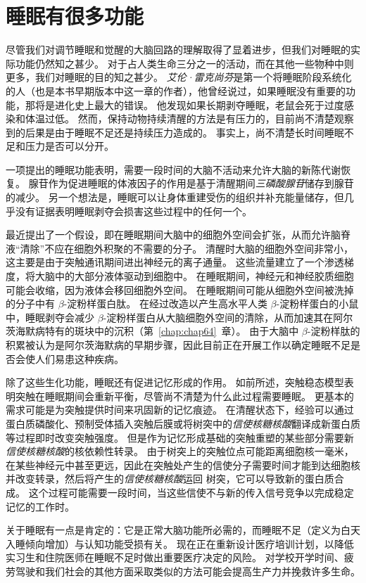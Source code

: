 \section{睡眠有很多功能}

尽管我们对调节睡眠和觉醒的大脑回路的理解取得了显着进步，但我们对睡眠的实际功能仍然知之甚少。
对于占人类生命三分之一的活动，而在其他一些物种中则更多，我们对睡眠的目的知之甚少。
\textit{艾伦·雷克尚芬}是第一个将睡眠阶段系统化的人（也是本书早期版本中这一章的作者），他曾经说过，如果睡眠没有重要的功能，那将是进化史上最大的错误。
他发现如果长期剥夺睡眠，老鼠会死于过度感染和体温过低。
然而，保持动物持续清醒的方法是有压力的，目前尚不清楚观察到的后果是由于睡眠不足还是持续压力造成的。
事实上，尚不清楚长时间睡眠不足和压力是否可以分开。


一项提出的睡眠功能表明，需要一段时间的大脑不活动来允许大脑的新陈代谢恢复。
腺苷作为促进睡眠的体液因子的作用是基于清醒期间\textit{三磷酸腺苷}储存到腺苷的减少。
另一个想法是，睡眠可以让身体重建受伤的组织并补充能量储存，但几乎没有证据表明睡眠剥夺会损害这些过程中的任何一个。


最近提出了一个假设，即在睡眠期间大脑中的细胞外空间会扩张，从而允许脑脊液“清除”不应在细胞外积聚的不需要的分子。
清醒时大脑的细胞外空间非常小，这主要是由于突触通讯期间进出神经元的离子通量。
这些流量建立了一个渗透梯度，将大脑中的大部分液体驱动到细胞中。
在睡眠期间，神经元和神经胶质细胞可能会收缩，因为液体会移回细胞外空间。
在睡眠期间可能从细胞外空间被洗掉的分子中有 $ \beta $-淀粉样蛋白肽。
在经过改造以产生高水平人类 $ \beta $-淀粉样蛋白的小鼠中，睡眠剥夺会减少 $ \beta $-淀粉样蛋白从大脑细胞外空间的清除，从而加速其在阿尔茨海默病特有的斑块中的沉积（第~\ref{chap:chap64}~章）。
由于大脑中 $ \beta $-淀粉样肽的积累被认为是阿尔茨海默病的早期步骤，因此目前正在开展工作以确定睡眠不足是否会使人们易患这种疾病。


除了这些生化功能，睡眠还有促进记忆形成的作用。
如前所述，突触稳态模型表明突触在睡眠期间会重新平衡，尽管尚不清楚为什么此过程需要睡眠。
更基本的需求可能是为突触提供时间来巩固新的记忆痕迹。
在清醒状态下，经验可以通过蛋白质磷酸化、预制受体插入突触后膜或将树突中的\textit{信使核糖核酸}翻译成新蛋白质等过程即时改变突触强度。
但是作为记忆形成基础的突触重塑的某些部分需要新\textit{信使核糖核酸}的核依赖性转录。
由于树突上的突触位点可能距离细胞核一毫米，在某些神经元中甚至更远，因此在突触处产生的信使分子需要时间才能到达细胞核并改变转录，然后将产生的\textit{信使核糖核酸}运回 树突，它可以导致新的蛋白质合成。
这个过程可能需要一段时间，当这些信使不与新的传入信号竞争以完成稳定记忆的工作时。


关于睡眠有一点是肯定的：它是正常大脑功能所必需的，而睡眠不足（定义为白天入睡倾向增加）与认知功能受损有关。
现在正在重新设计医疗培训计划，以降低实习生和住院医师在睡眠不足时做出重要医疗决定的风险。
对学校开学时间、疲劳驾驶和我们社会的其他方面采取类似的方法可能会提高生产力并挽救许多生命。




